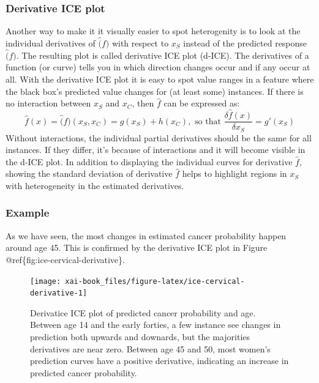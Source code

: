 \documentclass[12pt,]{krantz}
\theoremstyle{definition}
\theoremstyle{definition}
\theoremstyle{definition}
\theoremstyle{remark}
\begin{document}
\subsubsection{Derivative ICE plot}\label{derivative-ice-plot}

Another way to make it it visually easier to spot heterogenity is to
look at the individual derivatives of \(\hat(f)\) with respect to
\(x_S\) instead of the predicted response \(\hat(f)\). The resulting
plot is called derivative ICE plot (d-ICE). The derivatives of a
function (or curve) tells you in which direction changes occur and if
any occur at all. With the derivative ICE plot it is easy to spot value
ranges in a feature where the black box's predicted value changes for
(at least some) instances. If there is no interaction between \(x_S\)
and \(x_C\), then \(\hat{f}\) can be expressed as:
\[\hat{f}(x) = \hat(f)(x_S, x_C) = g(x_S) + h(x_C), \text{ so that } \frac{\delta\hat{f}(x)}{\delta x_S} = g'(x_S)\]
Without interactions, the individual partial derivatives should be the
same for all instances. If they differ, it's because of interactions and
it will become visible in the d-ICE plot. In addition to displaying the
individual curves for derivative \(\hat{f}\), showing the standard
deviation of derivative \(\hat{f}\) helps to highlight regions in
\(x_S\) with heterogeneity in the estimated derivatives.

\citep{goldstein2015peeking}

\subsubsection{Example}\label{example-2}

As we have seen, the most changes in estimated cancer probability happen
around age 45. This is confirmed by the derivative ICE plot in Figure
@ref\{fig:ice-cervical-derivative\}.

\begin{figure}

{\centering \texttt{[image: xai-book\_files/figure-latex/ice-cervical-derivative-1]} 

}

\caption{Derivatice ICE plot of predicted cancer probability and age. Between age 14 and the early forties, a few instance see changes in prediction both upwards and downards, but the majorities derivatives are near zero. Between age 45 and 50, most women's prediction curves have a positive derivative, indicating an increase in predicted cancer probability.}\label{fig:ice-cervical-derivative}
\end{figure}
\end{document}
